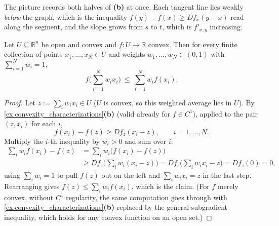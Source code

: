 \begin{center}
\end{center}

The picture records both halves of \textbf{(b)} at once. Each tangent line lies weakly
\emph{below} the graph, which is the inequality $f(y)-f(x) \geq Df_x(y-x)$ read along the
segment, and the slope grows from $s$ to $t$, which is $f'_{x,y}$ increasing.

\begin{proposition}
\label{prop:jensen_inequality}
Let $U \subseteq \mathbb{R}^n$ be open and convex and $f : U \to \mathbb{R}$ convex. Then for
every finite collection of points $x_1,\dots,x_N \in U$ and weights $w_1,\dots,w_N \in (0,1)$
with $\sum_{i=1}^N w_i = 1$,
\[f\Big(\sum_{i=1}^N w_ix_i\Big) \ \leq\ \sum_{i=1}^N w_if(x_i).\]
\end{proposition}

\begin{proof}
Let $z := \sum_i w_ix_i \in U$ ($U$ is convex, so this weighted average lies in $U$). By
\cref{ex:convexity_characterizations}\textbf{(b)} (valid already for $f \in C^1$), applied to the
pair $(z,x_i)$ for each $i$,
\[f(x_i) - f(z) \geq Df_z(x_i-z), \qquad i=1,\dots,N.\]
Multiply the $i$-th inequality by $w_i>0$ and sum over $i$:
\begin{align*}
\sum_i w_if(x_i) - f(z) &= \sum_i w_i\big(f(x_i)-f(z)\big) \\
  &\geq Df_z\Big(\sum_i w_i(x_i-z)\Big) = Df_z\Big(\sum_iw_ix_i - z\Big) = Df_z(0) = 0,
\end{align*}
using $\sum_iw_i=1$ to pull $f(z)$ out on the left and $\sum_iw_ix_i=z$ in the last step.
Rearranging gives $f(z) \leq \sum_iw_if(x_i)$, which is the claim. (For $f$ merely convex,
without $C^1$ regularity, the same computation goes through with
\cref{ex:convexity_characterizations}\textbf{(b)} replaced by the general subgradient
inequality, which holds for any convex function on an open set.)
\end{proof}

